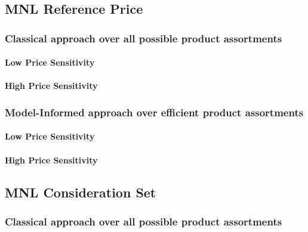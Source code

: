 

\subsection{MNL Reference Price}

\subsubsection{Classical approach over all possible product assortments}

\paragraph{Low Price Sensitivity}



\paragraph{High Price Sensitivity}



\subsubsection{Model-Informed approach over efficient product assortments}

\paragraph{Low Price Sensitivity}



\paragraph{High Price Sensitivity}



\subsection{MNL Consideration Set}

\subsubsection{Classical approach over all possible product assortments}

